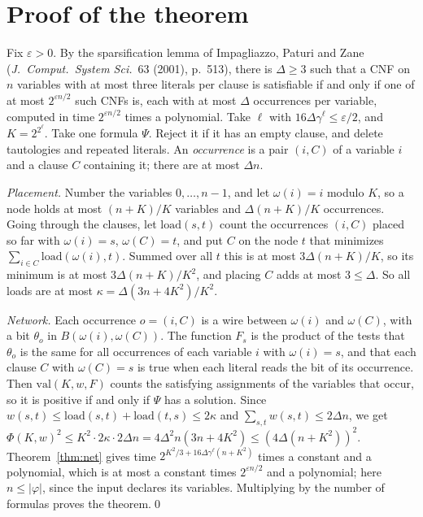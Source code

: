 \documentclass[10pt]{article}
\newcommand{\val}{\mathrm{val}}
\begin{document}
\section{Proof of the theorem}

Fix $\varepsilon>0$. By the sparsification lemma of Impagliazzo, Paturi and Zane (\emph{J.\ Comput.\ System Sci.}\ 63 (2001), p.~513), there is $\Delta\ge3$ such that a CNF on $n$ variables with at most three literals per clause is satisfiable if and only if one of at most $2^{\varepsilon n/2}$ such CNFs is, each with at most $\Delta$ occurrences per variable, computed in time $2^{\varepsilon n/2}$ times a polynomial. Take $\ell$ with $16\Delta\gamma^\ell\le\varepsilon/2$, and $K=2^{2^\ell}$. Take one formula $\Psi$. Reject it if it has an empty clause, and delete tautologies and repeated literals. An \emph{occurrence} is a pair $(i,C)$ of a variable $i$ and a clause $C$ containing it; there are at most $\Delta n$.

\emph{Placement.} Number the variables $0,\dots,n-1$, and let $\omega(i)=i$ modulo $K$, so a node holds at most $(n+K)/K$ variables and $\Delta(n+K)/K$ occurrences. Going through the clauses, let $\mathrm{load}(s,t)$ count the occurrences $(i,C)$ placed so far with $\omega(i)=s$, $\omega(C)=t$, and put $C$ on the node $t$ that minimizes $\sum_{i\in C}\mathrm{load}(\omega(i),t)$. Summed over all $t$ this is at most $3\Delta(n+K)/K$, so its minimum is at most $3\Delta(n+K)/K^2$, and placing $C$ adds at most $3\le\Delta$. So all loads are at most $\kappa=\Delta(3n+4K^2)/K^2$.

\emph{Network.} Each occurrence $o=(i,C)$ is a wire between $\omega(i)$ and $\omega(C)$, with a bit $\theta_o$ in $B(\omega(i),\omega(C))$. The function $F_s$ is the product of the tests that $\theta_o$ is the same for all occurrences of each variable $i$ with $\omega(i)=s$, and that each clause $C$ with $\omega(C)=s$ is true when each literal reads the bit of its occurrence. Then $\val(K,w,F)$ counts the satisfying assignments of the variables that occur, so it is positive if and only if $\Psi$ has a solution. Since $w(s,t)\le\mathrm{load}(s,t)+\mathrm{load}(t,s)\le2\kappa$ and $\sum_{s,t}w(s,t)\le2\Delta n$, we get $\Phi(K,w)^2\le K^2\cdot2\kappa\cdot2\Delta n=4\Delta^2n(3n+4K^2)\le(4\Delta(n+K^2))^2$. Theorem~\ref{thm:net} gives time $2^{K^2/3+16\Delta\gamma^\ell(n+K^2)}$ times a constant and a polynomial, which is at most a constant times $2^{\varepsilon n/2}$ and a polynomial; here $n\le|\varphi|$, since the input declares its variables. Multiplying by the number of formulas proves the theorem.\qed
\end{document}
